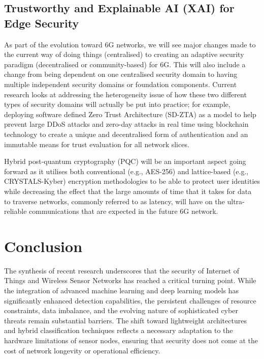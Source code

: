 \documentclass[12pt]{article}
\begin{document}
\subsection{Trustworthy and Explainable AI (XAI) for Edge Security}
As part of the evolution toward 6G networks, we will see major changes made to the current way of doing things (centralised) to creating an adaptive security paradigm (decentralised or community-based) for 6G. This will also include a change from being dependent on one centralised security domain to having multiple independent security domains or foundation components. Current research looks at addressing the heterogeneity issue of how these two different types of security domains will actually be put into practice; for example, deploying software defined Zero Trust Architecture (SD-ZTA) as a model to help prevent large DDoS attacks and zero-day attacks in real time using blockchain technology to create a unique and decentralised form of authentication and an immutable means for trust evaluation for all network slices.



Hybrid post-quantum cryptography (PQC) will be an important aspect going forward as it utilises both conventional (e.g., AES-256) and lattice-based (e.g., CRYSTALS-Kyber) encryption methodologies to be able to protect user identities while decreasing the effect that the large amounts of time that it takes for data to traverse networks, commonly referred to as latency, will have on the ultra-reliable communications that are expected in the future 6G network.
	\section{Conclusion}
    The synthesis of recent research underscores that the security of Internet of Things and Wireless Sensor Networks has reached a critical turning point. While the integration of advanced machine learning and deep learning models has significantly enhanced detection capabilities, the persistent challenges of resource constraints, data imbalance, and the evolving nature of sophisticated cyber threats remain substantial barriers. The shift toward lightweight architectures and hybrid classification techniques reflects a necessary adaptation to the hardware limitations of sensor nodes, ensuring that security does not come at the cost of network longevity or operational efficiency.
\end{document}
